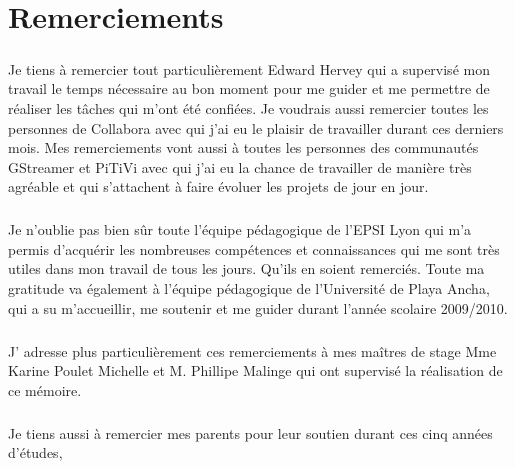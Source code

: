 \newpage \chapter*{Remerciements}

\paragraph {}

Je tiens à remercier tout particulièrement Edward Hervey qui a
supervisé mon travail %
le temps nécessaire au bon moment pour me guider et me permettre
de réaliser les tâches qui m'ont été confiées.
Je voudrais aussi remercier toutes les personnes de Collabora
avec qui j'ai eu le plaisir de travailler durant ces derniers mois.
Mes remerciements vont aussi à toutes les personnes des communautés GStreamer
et PiTiVi avec qui j'ai eu la chance de travailler de manière très
agréable et qui s'attachent à faire évoluer les projets %
 de jour en jour.

\paragraph {}

Je n'oublie pas bien sûr toute l'équipe pédagogique de l'EPSI Lyon
qui m'a permis d'acquérir les nombreuses compétences et connaissances
qui me sont très utiles dans mon travail de tous les jours. Qu'ils en soient remerciés.
Toute ma gratitude va également à l'équipe pédagogique de l'Université de Playa Ancha,
qui a su m'accueillir, me soutenir et me guider durant l'année scolaire 2009/2010.

\paragraph {}

J' adresse plus particulièrement ces remerciements à mes maîtres de
stage Mme Karine Poulet Michelle et M. Phillipe Malinge qui ont
supervisé la réalisation de ce mémoire.

\paragraph {}

Je tiens aussi à remercier mes parents pour leur soutien durant ces
cinq années d'études, %
